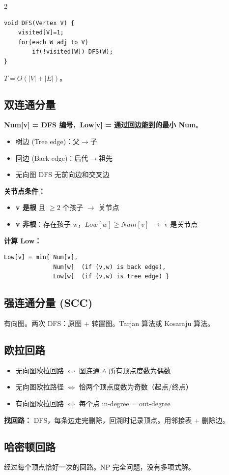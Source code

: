 \documentclass[10pt,a4paper]{article}
\begin{document}
\begin{multicols}{2}
\begin{lstlisting}
void DFS(Vertex V) {
    visited[V]=1;
    for(each W adj to V)
        if(!visited[W]) DFS(W);
}
\end{lstlisting}
$T=O(|V|+|E|)$。

\subsection*{双连通分量}

\textbf{Num[v] = DFS 编号}，\textbf{Low[v] = 通过回边能到的最小 Num}。

\begin{itemize}
\item 树边 (Tree edge)：父$\to$子
\item 回边 (Back edge)：后代$\to$祖先
\item 无向图 DFS 无前向边和交叉边
\end{itemize}

\textbf{关节点条件：}
\begin{itemize}
\item \textbf{v 是根} 且 $\ge 2$ 个孩子 $\to$ 关节点
\item \textbf{v 非根}：存在孩子 w，$Low[w] \ge Num[v]$ $\to$ v 是关节点
\end{itemize}

\textbf{计算 Low：}
\begin{lstlisting}
Low[v] = min{ Num[v],
              Num[w]  (if (v,w) is back edge),
              Low[w]  (if (v,w) is tree edge) }
\end{lstlisting}

\subsection*{强连通分量 (SCC)}

有向图。两次 DFS：原图 + 转置图。Tarjan 算法或 Kosaraju 算法。

\subsection*{欧拉回路}

\begin{itemize}
\item 无向图欧拉回路 $\iff$ 图连通 $\land$ 所有顶点度数为偶数
\item 无向图欧拉路径 $\iff$ 恰两个顶点度数为奇数（起点/终点）
\item 有向图欧拉回路 $\iff$ 每个点 in-degree = out-degree
\end{itemize}

\textbf{找回路：} DFS，每条边走完删除，回溯时记录顶点。用邻接表 + 删除边。

\subsection*{哈密顿回路}

经过每个顶点恰好一次的回路。NP 完全问题，没有多项式解。

\end{multicols}
\end{document}
